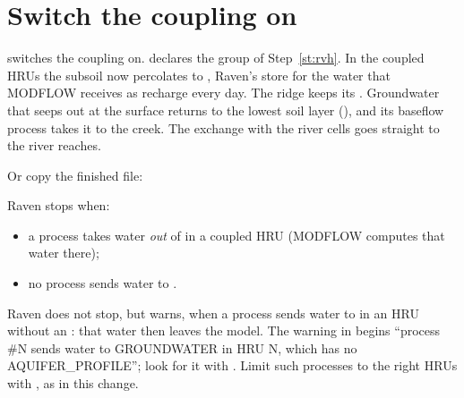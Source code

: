 \section{Switch the coupling on}

\label{st:rvi}
\why {} switches the coupling on.  declares the group 
of Step~\ref{st:rvh}. In the coupled HRUs the subsoil now percolates to , Raven's store for
the water that MODFLOW receives as recharge every day. The ridge keeps its . Groundwater that seeps out at
the surface returns to the lowest soil layer (), and its baseflow process takes it to the creek. The
exchange with the river cells goes straight to the river reaches.

Or copy the finished file: 
\begin{trouble}
Raven stops when:
\begin{itemize}
\item a process takes water \emph{out} of  in a coupled HRU (MODFLOW computes that water there);
\item no process sends water to .
\end{itemize}
Raven does not stop, but warns, when a process sends water to  in an HRU without an
: that water then leaves the model. The warning in  begins
``process \#N sends water to GROUNDWATER in HRU N, which has no AQUIFER\_PROFILE''; look for it with
. Limit such processes to the right HRUs with , as in this
change.
\end{trouble}
